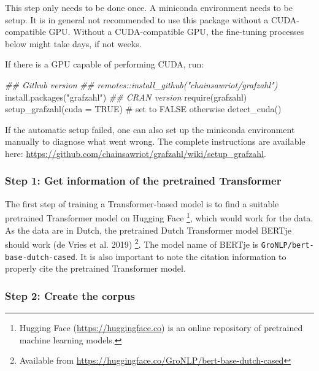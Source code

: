 \documentclass[
]{ccr}
\newenvironment{Shaded}{\begin{snugshade}}{\end{snugshade}}
\newcommand{\AttributeTok}[1]{\textcolor[rgb]{0.40,0.45,0.13}{#1}}
\newcommand{\CommentTok}[1]{\textcolor[rgb]{0.37,0.37,0.37}{#1}}
\newcommand{\ConstantTok}[1]{\textcolor[rgb]{0.56,0.35,0.01}{#1}}
\newcommand{\DocumentationTok}[1]{\textcolor[rgb]{0.37,0.37,0.37}{\textit{#1}}}
\newcommand{\FunctionTok}[1]{\textcolor[rgb]{0.28,0.35,0.67}{#1}}
\newcommand{\NormalTok}[1]{\textcolor[rgb]{0.00,0.23,0.31}{#1}}
\newcommand{\StringTok}[1]{\textcolor[rgb]{0.13,0.47,0.30}{#1}}
\begin{document}
This step only needs to be done once. A miniconda environment needs to
be setup. It is in general not recommended to use this package without a
CUDA-compatible GPU. Without a CUDA-compatible GPU, the fine-tuning
processes below might take days, if not weeks.

If there is a GPU capable of performing CUDA, run:

\begin{Shaded}
\begin{Highlighting}[]
\DocumentationTok{\#\# Github version}
\DocumentationTok{\#\# remotes::install\_github("chainsawriot/grafzahl")}
\FunctionTok{install.packages}\NormalTok{(}\StringTok{"grafzahl"}\NormalTok{) }\DocumentationTok{\#\# CRAN version}
\FunctionTok{require}\NormalTok{(grafzahl)}
\FunctionTok{setup\_grafzahl}\NormalTok{(}\AttributeTok{cuda =} \ConstantTok{TRUE}\NormalTok{) }\CommentTok{\# set to FALSE otherwise}
\FunctionTok{detect\_cuda}\NormalTok{()}
\end{Highlighting}
\end{Shaded}

If the automatic setup failed, one can also set up the miniconda
environment manually to diagnose what went wrong. The complete
instructions are available here:
\url{https://github.com/chainsawriot/grafzahl/wiki/setup_grafzahl}.

\hypertarget{step-1-get-information-of-the-pretrained-transformer}{%
\subsubsection{Step 1: Get information of the pretrained
Transformer}\label{step-1-get-information-of-the-pretrained-transformer}}

The first step of training a Transformer-based model is to find a
suitable pretrained Transformer model on Hugging Face \footnote{Hugging
  Face (\url{https://huggingface.co}) is an online repository of
  pretrained machine learning models.}, which would work for the data.
As the data are in Dutch, the pretrained Dutch Transformer model BERTje
should work (de Vries et al. 2019) \footnote{Available from
  \url{https://huggingface.co/GroNLP/bert-base-dutch-cased}}. The model
name of BERTje is \texttt{GroNLP/bert-base-dutch-cased}. It is also
important to note the citation information to properly cite the
pretrained Transformer model.

\hypertarget{step-2-create-the-corpus}{%
\subsubsection{Step 2: Create the
corpus}\label{step-2-create-the-corpus}}
\end{document}
